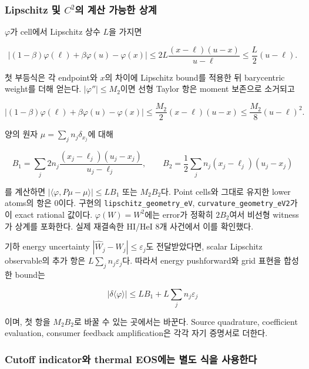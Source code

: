 \documentclass[11pt,a4paper]{article}
\begin{document}
\hypertarget{lipschitz-uxbc0f-c2uxc758-uxacc4uxc0b0-uxac00uxb2a5uxd55c-uxc0c1uxacc4}{%
\subsubsection{\texorpdfstring{Lipschitz 및 \(C^2\)의 계산 가능한 상계}{Lipschitz 및 C\^{}2의 계산 가능한 상계}}\label{lipschitz-uxbc0f-c2uxc758-uxacc4uxc0b0-uxac00uxb2a5uxd55c-uxc0c1uxacc4}}

\(\varphi\)가 cell에서 Lipschitz 상수 \(L\)을 가지면

\[
 \left|(1-\beta)\varphi(\ell)+\beta\varphi(u)-\varphi(x)\right|
 \le 2L\frac{(x-\ell)(u-x)}{u-\ell}
 \le\frac L2(u-\ell).
\tag{GR.18}
\]

첫 부등식은 각 endpoint와 \(x\)의 차이에 Lipschitz bound를 적용한 뒤 barycentric weight를 더해 얻는다. \(|\varphi''|\le M_2\)이면 선형 Taylor 항은 moment 보존으로 소거되고

\[
 \left|(1-\beta)\varphi(\ell)+\beta\varphi(u)-\varphi(x)\right|
 \le\frac{M_2}{2}(x-\ell)(u-x)
 \le\frac{M_2}{8}(u-\ell)^2.
\tag{GR.19}
\]

양의 원자 \(\mu=\sum_j n_j\delta_{x_j}\)에 대해

\[
 B_1=\sum_j2n_j\frac{(x_j-\ell_j)(u_j-x_j)}{u_j-\ell_j},\qquad
 B_2=\frac12\sum_jn_j(x_j-\ell_j)(u_j-x_j)
\tag{GR.20}
\]

를 계산하면 \(|\langle\varphi,P\mu-\mu\rangle|\le LB_1\) 또는 \(M_2B_2\)다. Point cells와 그대로 유지한 lower atoms의 항은 0이다. 구현의 \texttt{lipschitz\_geometry\_eV}, \texttt{curvature\_geometry\_eV2}가 이 exact rational 값이다. \(\varphi(W)=W^2\)에는 error가 정확히 \(2B_2\)여서 비선형 witness가 상계를 포화한다. 실제 재결속한 HI/HeI 8개 사건에서 이를 확인했다.

기하 energy uncertainty \(|\widehat W_j-W_j|\le\varepsilon_j\)도 전달받았다면, scalar Lipschitz observable의 추가 항은 \(L\sum_jn_j\varepsilon_j\)다. 따라서 energy pushforward와 grid 표현을 합성한 bound는

\[
 |\delta\langle\varphi\rangle|
 \le LB_1+L\sum_jn_j\varepsilon_j
\tag{GR.21}
\]

이며, 첫 항을 \(M_2B_2\)로 바꿀 수 있는 곳에서는 바꾼다. Source quadrature, coefficient evaluation, consumer feedback amplification은 각각 자기 증명서로 더한다.

\hypertarget{cutoff-indicatoruxc640-thermal-eosuxc5d0uxb294-uxbcc4uxb3c4-uxc2dduxc744-uxc0acuxc6a9uxd55cuxb2e4}{%
\subsubsection{Cutoff indicator와 thermal EOS에는 별도 식을 사용한다}\label{cutoff-indicatoruxc640-thermal-eosuxc5d0uxb294-uxbcc4uxb3c4-uxc2dduxc744-uxc0acuxc6a9uxd55cuxb2e4}}
\end{document}
